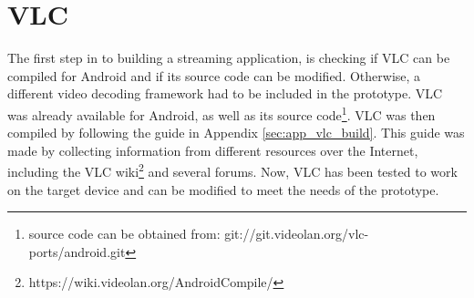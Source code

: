 \section{VLC}
\thispagestyle{fancy}
The first step in to building a streaming application, is checking if VLC can be compiled for Android and if its source code can be modified. Otherwise, a different video decoding framework had to be included in the prototype. VLC was already available for Android, as well as its source code\footnote{source code can be obtained from: git://git.videolan.org/vlc-ports/android.git}. VLC was then compiled by following the guide in Appendix \ref{sec:app_vlc_build}. This guide was made by collecting information from different resources over the Internet, including the VLC wiki\footnote{https://wiki.videolan.org/AndroidCompile/} and several forums. Now, VLC has been tested to work on the target device and can be modified to meet the needs of the prototype.